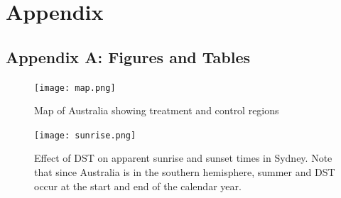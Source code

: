 \section*{Appendix}



\FloatBarrier
{}
\subsection*{Appendix A: Figures and Tables}

\begin{figure}[ht]
    \centering
    \texttt{[image: map.png]}
    \caption{Map of Australia showing treatment and control regions}
    \label{fig:map}
\end{figure}

\begin{figure}[ht]
    \centering
    \texttt{[image: sunrise.png]}
    \caption[Effect of \acs{DST} on apparent sunrise and sunset times in Sydney]{Effect of \acs{DST} on apparent sunrise and sunset times in Sydney. Note that since Australia is in the southern hemisphere, summer and \acs{DST} occur at the start and end of the calendar year.}
    \label{fig:sunrise plot}
\end{figure}

